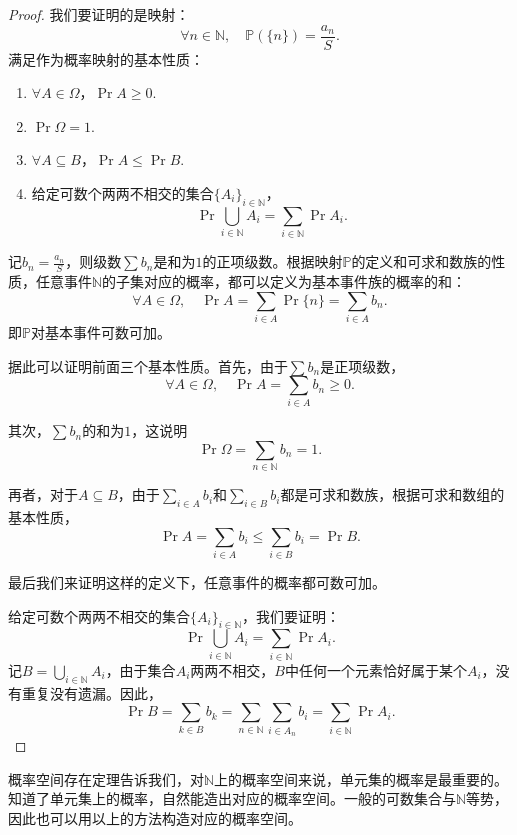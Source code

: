 \documentclass[12pt,UTF8]{ctexbook}
\begin{document}
\begin{proof}
    我们要证明的是映射：
    $$ \forall n\in\mathbb{N},\quad \mathbb{P}(\{n\}) = \frac{a_n}{S}.$$
    满足作为概率映射的基本性质：
    \begin{enumerate}
        \item $\forall A \in \Omega$，$\Pr{A} \geqslant 0.$
        \item $\Pr{\Omega} = 1.$
        \item $\forall A \subseteq B$，$\Pr{A} \leqslant \Pr{B}.$
        \item 给定可数个两两不相交的集合$\{A_i\}_{i\in \mathbb{N}} $，
        $$ \Pr{\bigcup_{i\in \mathbb{N}} A_i} = \sum_{i\in \mathbb{N}} \Pr{A_i}. $$
    \end{enumerate}

    记$b_n = \frac{a_n}{S}$，则级数$\sum b_n$是和为$1$的正项级数。根据映射$\mathbb{P}$的定义和可求和数族的性质，任意事件$\mathbb{N}$的子集对应的概率，都可以定义为基本事件族的概率的和：
    $$ \forall A \in \Omega, \quad \Pr{A} = \sum_{i\in A} \Pr{\{n\}} = \sum_{i\in A} b_n. $$
    即$\mathbb{P}$对基本事件可数可加。

    据此可以证明前面三个基本性质。首先，由于$\sum b_n$是正项级数，
    $$\forall A \in \Omega ,\quad \Pr{A} = \sum_{i\in A} b_n \geqslant 0.$$
    
    其次，$\sum b_n$的和为$1$，这说明
    $$\Pr{\Omega} = \sum_{n\in \mathbb{N}} b_n = 1.$$

    再者，对于$A \subseteq B$，由于$\sum_{i\in A} b_i$和$\sum_{i\in B} b_i$都是可求和数族，根据可求和数组的基本性质，
    $$\Pr{A} = \sum_{i\in A} b_i \leqslant \sum_{i\in B} b_i = \Pr{B}.$$
    
    最后我们来证明这样的定义下，任意事件的概率都可数可加。

    给定可数个两两不相交的集合$\{A_i\}_{i\in \mathbb{N}} $，我们要证明：
    $$ \Pr{\bigcup_{i\in \mathbb{N}} A_i} = \sum_{i\in \mathbb{N}} \Pr{A_i}. $$
    记$B = \bigcup_{i\in \mathbb{N}} A_i$，由于集合$A_i$两两不相交，$B$中任何一个元素恰好属于某个$A_i$，没有重复没有遗漏。因此，
    $$ \Pr{B} = \sum_{k\in B} b_k = \sum_{n\in \mathbb{N}} \sum_{i\in A_n} b_i = \sum_{i\in \mathbb{N}} \Pr{A_i}. $$

\end{proof}

概率空间存在定理告诉我们，对$\mathbb{N}$上的概率空间来说，单元集的概率是最重要的。知道了单元集上的概率，自然能造出对应的概率空间。一般的可数集合与$\mathbb{N}$等势，因此也可以用以上的方法构造对应的概率空间。
\end{document}
